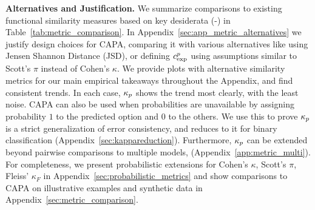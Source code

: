 \textbf{Alternatives and Justification.} We summarize comparisons to existing functional similarity measures based on key desiderata (-) in Table~\ref{tab:metric_comparison}. In Appendix~\ref{sec:app_metric_alternatives} we justify design choices for CAPA, comparing it with various alternatives like using Jensen Shannon Distance (JSD), or defining $c_{\text{exp}}^{p}$ using assumptions similar to Scott's $\pi$ instead of Cohen's $\kappa$. We provide plots with alternative similarity metrics for our main empirical takeaways throughout the Appendix, and find consistent trends. In each case, $\kappa_{p}$ shows the trend most clearly, with the least noise. CAPA can also be used when probabilities are unavailable by assigning probability $1$ to the predicted option and $0$ to the others. We use this to prove $\kappa_{p}$ is a strict generalization of error consistency, and reduces to it for binary classification (Appendix~\ref{sec:kappareduction}). Furthermore, $\kappa_{p}$ can be extended beyond pairwise comparisons to multiple models, (Appendix~\ref{app:metric_multi}). For completeness, we present probabilistic extensions for Cohen’s $\kappa$, Scott's $\pi$, Fleiss' $\kappa_F$ in Appendix~\ref{sec:probabilistic_metrics} and show comparisons to CAPA on illustrative examples and synthetic data in Appendix~\ref{sec:metric_comparison}. 

